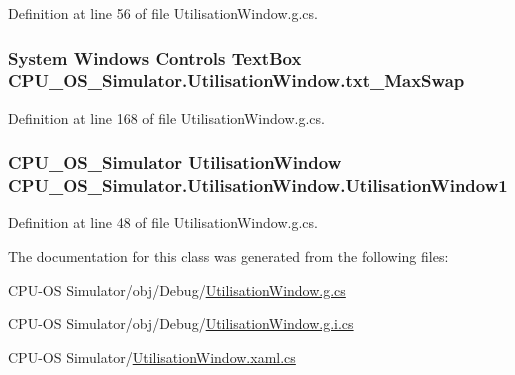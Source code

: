 Definition at line 56 of file Utilisation\+Window.\+g.\+cs.

\hypertarget{class_c_p_u___o_s___simulator_1_1_utilisation_window_a28206b9c624b718c2831c635e4169fe4}{}
\subsubsection[{txt\+\_\+\+Max\+Swap}]{\setlength{\rightskip}{0pt plus 5cm}System Windows Controls Text\+Box C\+P\+U\+\_\+\+O\+S\+\_\+\+Simulator.\+Utilisation\+Window.\+txt\+\_\+\+Max\+Swap\hspace{0.3cm}{\ttfamily [package]}}\label{class_c_p_u___o_s___simulator_1_1_utilisation_window_a28206b9c624b718c2831c635e4169fe4}


Definition at line 168 of file Utilisation\+Window.\+g.\+cs.

\hypertarget{class_c_p_u___o_s___simulator_1_1_utilisation_window_a702f7f3600001706fb93aa48fd2049c1}{}
\subsubsection[{Utilisation\+Window1}]{\setlength{\rightskip}{0pt plus 5cm}C\+P\+U\+\_\+\+O\+S\+\_\+\+Simulator {\bf Utilisation\+Window} C\+P\+U\+\_\+\+O\+S\+\_\+\+Simulator.\+Utilisation\+Window.\+Utilisation\+Window1\hspace{0.3cm}{\ttfamily [package]}}\label{class_c_p_u___o_s___simulator_1_1_utilisation_window_a702f7f3600001706fb93aa48fd2049c1}


Definition at line 48 of file Utilisation\+Window.\+g.\+cs.



The documentation for this class was generated from the following files\+:\begin{DoxyCompactItemize}
\item 
C\+P\+U-\/\+O\+S Simulator/obj/\+Debug/\hyperlink{_utilisation_window_8g_8cs}{Utilisation\+Window.\+g.\+cs}\item 
C\+P\+U-\/\+O\+S Simulator/obj/\+Debug/\hyperlink{_utilisation_window_8g_8i_8cs}{Utilisation\+Window.\+g.\+i.\+cs}\item 
C\+P\+U-\/\+O\+S Simulator/\hyperlink{_utilisation_window_8xaml_8cs}{Utilisation\+Window.\+xaml.\+cs}\end{DoxyCompactItemize}
